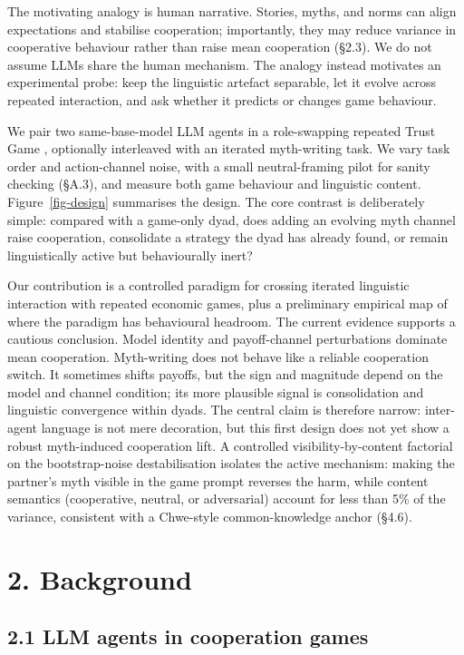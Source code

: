 \documentclass[10pt,letterpaper]{article}
\begin{document}
The motivating analogy is human narrative. Stories, myths, and norms can
align expectations and stabilise cooperation; importantly, they may
reduce variance in cooperative behaviour rather than raise mean
cooperation (§2.3). We do not assume LLMs share the human mechanism. The
analogy instead motivates an experimental probe: keep the linguistic
artefact separable, let it evolve across repeated interaction, and ask
whether it predicts or changes game behaviour.

We pair two same-base-model LLM agents in a role-swapping repeated Trust
Game \citep{berg1995}, optionally interleaved with an iterated
myth-writing task. We vary task order and action-channel noise, with a
small neutral-framing pilot for sanity checking (§A.3), and measure both
game behaviour and linguistic content. Figure~\ref{fig-design}
summarises the design. The core contrast is deliberately simple:
compared with a game-only dyad, does adding an evolving myth channel
raise cooperation, consolidate a strategy the dyad has already found, or
remain linguistically active but behaviourally inert?

Our contribution is a controlled paradigm for crossing iterated
linguistic interaction with repeated economic games, plus a preliminary
empirical map of where the paradigm has behavioural headroom. The
current evidence supports a cautious conclusion. Model identity and
payoff-channel perturbations dominate mean cooperation. Myth-writing
does not behave like a reliable cooperation switch. It sometimes shifts
payoffs, but the sign and magnitude depend on the model and channel
condition; its more plausible signal is consolidation and linguistic
convergence within dyads. The central claim is therefore narrow:
inter-agent language is not mere decoration, but this first design does
not yet show a robust myth-induced cooperation lift. A controlled
visibility-by-content factorial on the bootstrap-noise destabilisation
isolates the active mechanism: making the partner's myth visible in the
game prompt reverses the harm, while content semantics (cooperative,
neutral, or adversarial) account for less than 5\% of the variance,
consistent with a Chwe-style common-knowledge anchor (§4.6).

\section{2. Background}\label{background}

\subsection{2.1 LLM agents in cooperation
games}\label{llm-agents-in-cooperation-games}
\end{document}
